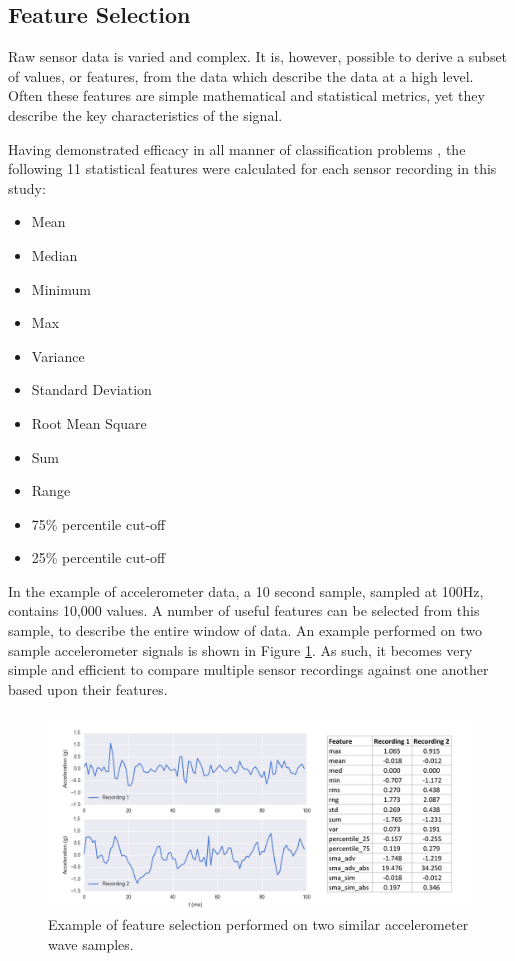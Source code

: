 \subsection{Feature Selection}
Raw sensor data is varied and complex. It is, however, possible to derive a subset of values, or features, from the data which describe the data at a high level. Often these features are simple mathematical and statistical metrics, yet they describe the key characteristics of the signal.

Having demonstrated efficacy in all manner of classification problems \cite{Figo2010, Dargie2009, Bao2004}, the following 11 statistical features were calculated for each sensor recording in this study:

\begin{itemize}[noitemsep,topsep=0pt]
  \item Mean
  \item Median
  \item Minimum
  \item Max
  \item Variance
  \item Standard Deviation
  \item Root Mean Square
  \item Sum
  \item Range
  \item 75\% percentile cut-off
  \item 25\% percentile cut-off
\end{itemize}

In the example of accelerometer data, a 10 second sample, sampled at 100Hz, contains 10,000 values. A number of useful features can be selected from this sample, to describe the entire window of data. An example performed on two sample accelerometer signals is shown in Figure \ref{fig: feature-selection-example}. As such, it becomes very simple and efficient to compare multiple sensor recordings against one another based upon their features.

\begin{figure}[h]
    \centering
        \includegraphics[scale=0.38, angle=0]{Files/treatment-study-1/figures/feature-selection-example}
        \caption{Example of feature selection performed on two similar accelerometer wave samples.}
        \label{fig: feature-selection-example}
\end{figure}

